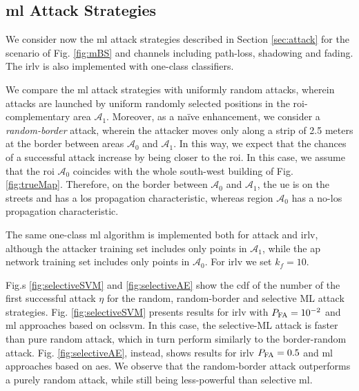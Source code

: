 \documentclass[draftcls,onecolumn,12pt]{IEEEtran}
\begin{document}
\subsection{\ac{ml} Attack Strategies}

We consider now the \ac{ml} attack strategies described in Section \ref{sec:attack} for the scenario of Fig. \ref{fig:mBS} and channels including path-loss, shadowing and fading. The \ac{irlv} is also implemented with one-class classifiers. 


We compare the \ac{ml} attack strategies with uniformly random attacks, wherein attacks are launched by uniform randomly selected positions in the \ac{roi}-complementary area $\mathcal{A}_1$.  Moreover, as a na\"ive enhancement, we consider a \emph{random-border} attack, wherein the attacker moves only along a strip of 2.5 meters at the border between areas $\mathcal{A}_0$ and $\mathcal A_1$. In this way, we expect that the chances of a successful attack increase by being closer to the \ac{roi}. In this case, we assume that the \ac{roi} $\mathcal A_0$ coincides with the whole south-west building of Fig. \ref{fig:trueMap}. Therefore, on the border between $\mathcal A_0$ and $\mathcal A_1$, the \ac{ue} is on the streets and has a \ac{los} propagation characteristic, whereas region $\mathcal A_0$ has a no-\ac{los} propagation characteristic. 

The same one-class \ac{ml} algorithm is implemented both for attack and \ac{irlv}, although the attacker training set includes only points in $\mathcal A_1$, while the \ac{ap} network training set includes only  points in $\mathcal A_0$. For  \ac{irlv}  we set $k_f=10$.

Fig.s \ref{fig:selectiveSVM} and \ref{fig:selectiveAE} show the \ac{cdf} of the number of the first successful attack $\eta$ for the random, random-border and selective ML attack strategies. Fig. \ref{fig:selectiveSVM} presents results for \ac{irlv} with $P_{\rm FA}=10^{-2}$ and \ac{ml} approaches based on \ac{oclssvm}. In this case, the selective-ML attack is faster than pure random attack, which in turn perform similarly to the border-random  attack.  Fig. \ref{fig:selectiveAE}, instead, shows results for  \ac{irlv} $P_{\rm FA} =0.5$ and \ac{ml} approaches based on \acp{ae}. We observe that the random-border attack outperforms a purely random attack, while still being less-powerful than selective \ac{ml}. 
\end{document}
